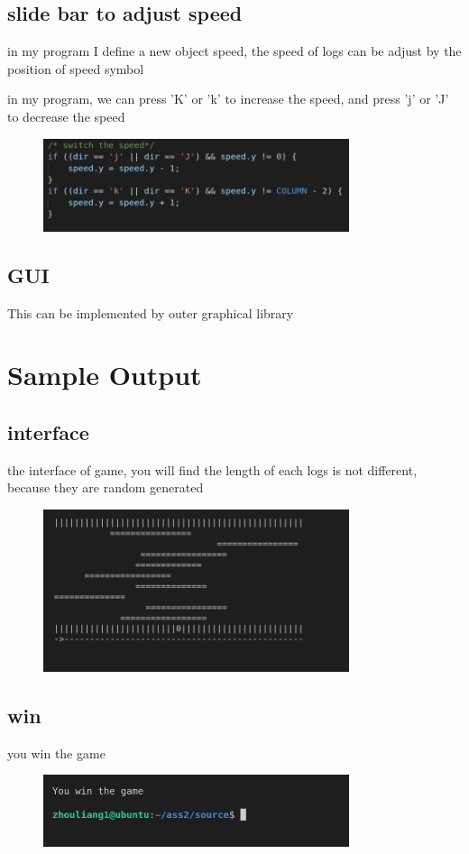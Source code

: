 \documentclass{article}
\begin{document}
\subsection{slide bar to adjust speed}
in my program I define a new object speed, the speed of logs can be adjust by the position of speed symbol

in my program, we can press 'K' or 'k' to increase the speed, and press 'j' or 'J' to decrease the speed

\begin{figure}[htbp]
    \centering
    \includegraphics[width = 0.8\textwidth]{speed.png}
\end{figure}

\subsection{GUI}
This can be implemented by outer graphical library

\section{Sample Output}
\subsection{interface}
the interface of game, you will find the length of each logs is not different, because they are random generated
\begin{figure}[htbp]
    \centering
    \includegraphics[width = 0.8\textwidth]{inter.png}
\end{figure}
\subsection{win}
you win the game
\begin{figure}[htbp]
    \centering
    \includegraphics[width = 0.8\textwidth]{win.png}
\end{figure}
\clearpage
\end{document}
